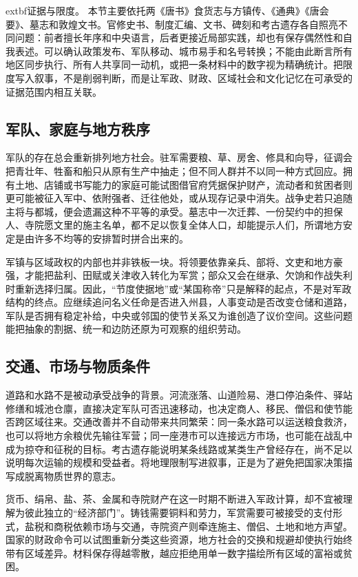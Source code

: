 \noindent	extbf{证据与限度。} 本节主要依托两《唐书》食货志与方镇传、《通典》《唐会要》、墓志和敦煌文书。官修史书、制度汇编、文书、碑刻和考古遗存各自照亮不同问题：前者擅长年序和中央语言，后者更接近局部实践，却也有保存偶然性和自我表述。可以确认政策发布、军队移动、城市易手和名号转换；不能由此断言所有地区同步执行、所有人共享同一动机，或把一条材料中的数字视为精确统计。把限度写入叙事，不是削弱判断，而是让军政、财政、区域社会和文化记忆在可承受的证据范围内相互关联。

\subsection{军队、家庭与地方秩序}
军队的存在总会重新排列地方社会。驻军需要粮、草、房舍、修具和向导，征调会把青壮年、牲畜和船只从原有生产中抽走；但不同人群并不以同一种方式回应。拥有土地、店铺或书写能力的家庭可能试图借官府凭据保护财产，流动者和贫困者则更可能被征入军中、依附强者、迁往他处，或从现存记录中消失。战争史若只追随主将与都城，便会遗漏这种不平等的承受。墓志中一次迁葬、一份契约中的担保人、寺院愿文里的施主名单，都不足以恢复全体人口，却能提示人们，所谓地方安定是由许多不均等的安排暂时拼合出来的。

军镇与区域政权的内部也并非铁板一块。将领要依靠亲兵、部将、文吏和地方豪强，才能把盐利、田赋或关津收入转化为军赏；部众又会在继承、欠饷和作战失利时重新选择归属。因此，“节度使据地”或“某国称帝”只是解释的起点，不是对军政结构的终点。应继续追问名义任命是否进入州县，人事变动是否改变仓储和道路，军队是否拥有稳定补给，中央或邻国的使节关系又为谁创造了议价空间。这些问题能把抽象的割据、统一和边防还原为可观察的组织劳动。

\subsection{交通、市场与物质条件}
道路和水路不是被动承受战争的背景。河流涨落、山道险易、港口停泊条件、驿站修缮和城池仓廪，直接决定军队可否迅速移动，也决定商人、移民、僧侣和使节能否跨区域往来。交通改善并不自动带来共同繁荣：同一条水路可以运送粮食救济，也可以将地方余粮优先输往军营；同一座港市可以连接远方市场，也可能在战乱中成为掠夺和征税的目标。考古遗存能说明某条线路或某类生产曾经存在，尚不足以说明每次运输的规模和受益者。将地理限制写进叙事，正是为了避免把国家决策描写成脱离物质世界的意志。

货币、绢帛、盐、茶、金属和寺院财产在这一时期不断进入军政计算，却不宜被理解为彼此独立的“经济部门”。铸钱需要铜料和劳力，军赏需要可被接受的支付形式，盐税和商税依赖市场与交通，寺院资产则牵连施主、僧侣、土地和地方声望。国家的财政命令可以试图重新分类这些资源，地方社会的交换和规避却使执行始终带有区域差异。材料保存得越零散，越应拒绝用单一数字描绘所有区域的富裕或贫困。

